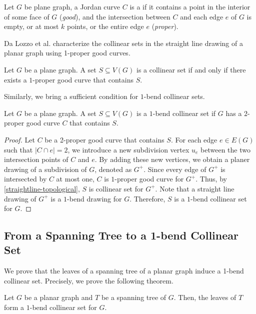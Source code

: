Let $G$ be plane graph, a Jordan curve $C$ is a  if it contains a point in the interior of some face of $G$ (\textit{good}), and the intersection between $C$ and each edge $e$ of $G$ is empty, or at most $k$ points, or the entire edge $e$ (\textit{proper}).

Da Lozzo et al. \cite{DBLP:journals/jocg/LozzoDFMR18} characterize the collinear sets in the straight line drawing of a planar graph using 1-proper good curves.

\begin{thm} \label{straightline-topological}
Let $G$ be a plane graph. A set $S \subseteq V(G)$ is a collinear set if and only if there exists a $1$-proper good curve that contains $S$.
\end{thm}

Similarly, we bring a sufficient condition for $1$-bend collinear sets.

\begin{observation} \label{1-bend-topological}
    Let $G$ be a plane graph. A set $S \subseteq V(G)$ is a $1$-bend collinear set if $G$ has a $2$-proper good curve $C$ that contains $S$.
\end{observation}

\begin{proof}
Let $C$ be a 2-proper good curve that contains $S$. For each edge $e \in E(G)$ such that $|C \cap e| = 2$, we introduce a new subdivision vertex $u_e$ between the two intersection points of $C$ and $e$. By adding these new vertices, we obtain a planer drawing of a subdivision of $G$, denoted as $G^+$. Since every edge of $G^+$ is intersected by $C$ at most one, $C$ is $1$-proper good curve for $G^+$. Thus, by \cref{straightline-topological}, $S$ is collinear set for $G^+$. Note that a straight line drawing of $G^+$ is a $1$-bend drawing for $G$. Therefore, $S$ is a $1$-bend collinear set for $G$.
\end{proof}

\subsection{From a Spanning Tree to a 1-bend Collinear Set}

We prove that the leaves of a spanning tree of a planar graph induce a 1-bend collinear set. Precisely, we prove the following theorem.

\begin{lem} \label{spanning_tree_to_collinear_set}

Let $G$ be a planar graph and $T$ be a spanning tree of $G$. Then, the leaves of $T$ form a $1$-bend collinear set for $G$.

\end{lem}

